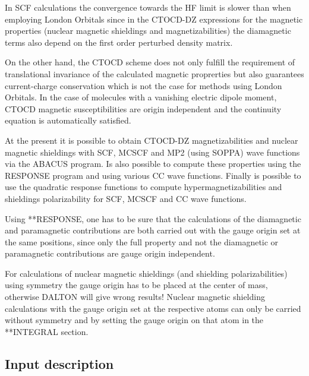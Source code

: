 In SCF calculations the convergence towards the HF limit is slower 
than when employing London Orbitals since in the CTOCD-DZ expressions for 
the magnetic properties (nuclear magnetic shieldings and magnetizabilities) 
the diamagnetic terms also depend on the first order perturbed density matrix.

On the other hand, the CTOCD scheme does not only fulfill the requirement of translational 
invariance of the calculated magnetic proprerties but also guarantees
current-charge conservation which is not the case for methods using  
London Orbitals. In the case of molecules with a vanishing electric
dipole moment, CTOCD magnetic susceptibilities are origin independent
and the continuity equation is automatically satisfied. 

At the present it is possible to obtain CTOCD-DZ magnetizabilities and nuclear magnetic
shieldings with SCF, MCSCF and MP2 (using SOPPA) wave functions via the ABACUS
program. Is also possible to compute these properties using the RESPONSE program and using
various CC wave functions.  Finally is possible to use the quadratic
response functions to compute hypermagnetizabilities and shieldings polarizability
for SCF, MCSCF and CC wave functions.

Using **RESPONSE, one has to be sure that the calculations of the diamagnetic and paramagnetic
contributions are both carried out with the gauge origin set at the same
positions, since only the full property and not the diamagnetic or paramagnetic contributions are 
gauge origin independent.

For calculations of nuclear magnetic shieldings (and shielding polarizabilities) using 
symmetry the gauge origin has to be placed at the center of mass, otherwise DALTON will 
give wrong results! Nuclear magnetic shielding calculations with the gauge origin set
at the respective atoms can only be carried without symmetry and by setting the
gauge origin on that atom in the **INTEGRAL section.

\subsection{Input description}\label{sec:ctocdinput}

\begin{center}
\end{center}

